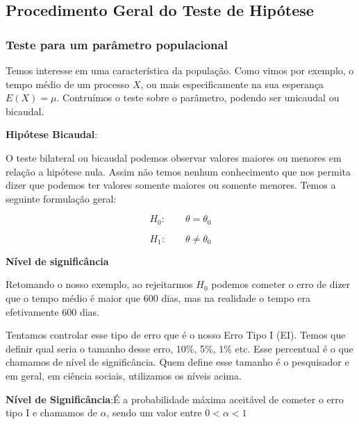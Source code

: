 \documentclass[
  letterpaper,
  DIV=11,
  numbers=noendperiod]{scrreprt}
\begin{document}
\subsection{Procedimento Geral do Teste de
Hipótese}\label{procedimento-geral-do-teste-de-hipuxf3tese}

\subsubsection{Teste para um parâmetro
populacional}\label{teste-para-um-paruxe2metro-populacional}

Temos interesse em uma característica da população. Como vimos por
exemplo, o tempo médio de um processo \(X\), ou mais especificamente na
sua esperança \(E(X)=\mu\). Contruímos o teste sobre o parâmetro,
podendo ser unicaudal ou bicaudal.

\textbf{Hipótese Bicaudal}:

O teste bilateral ou bicaudal podemos observar valores maiores ou
menores em relação a hipótese nula. Assim não temos nenhum conhecimento
que nos permita dizer que podemos ter valores somente maiores ou somente
menores. Temos a seguinte formulação geral:

\[H_0: \qquad \theta=\theta_0\]

\[H_1: \qquad \theta \neq \theta_0\]

\textbf{Nível de significância}

Retomando o nosso exemplo, ao rejeitarmos \(H_0\) podemos cometer o erro
de dizer que o tempo médio é maior que 600 dias, mas na realidade o
tempo era efetivamente 600 dias.

Tentamos controlar esse tipo de erro que é o nosso Erro Tipo I (EI).
Temos que definir qual seria o tamanho desse erro, 10\%, 5\%, 1\% etc.
Esse percentual é o que chamamos de nível de significância. Quem define
esse tamanho é o pesquisador e em geral, em ciência sociais, utilizamos
os níveis acima.

\begin{tcolorbox}[enhanced jigsaw, titlerule=0mm, colback=white, coltitle=black, opacityback=0, breakable, colbacktitle=quarto-callout-note-color!10!white, toprule=.15mm, colframe=quarto-callout-note-color-frame, toptitle=1mm, bottomtitle=1mm, opacitybacktitle=0.6, left=2mm, arc=.35mm, rightrule=.15mm, bottomrule=.15mm, leftrule=.75mm, title=\textcolor{quarto-callout-note-color}{\faInfo}\hspace{0.5em}{Nível de Signficãncia}]

\textbf{Nível de Significância}:É a probabilidade máxima aceitável de
cometer o erro tipo I e chamamos de \(\alpha\), sendo um valor entre
\(0<\alpha<1\)

\end{tcolorbox}
\end{document}
